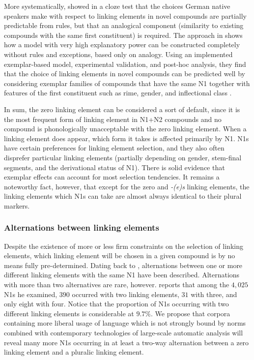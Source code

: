 More systematically, \textcite{DresslerEa2001} showed in a cloze test that the choices German native speakers make with respect to linking elements in novel compounds are partially predictable from rules, but that an analogical component (similarity to existing compounds with the same first constituent) is required.
The approach in \textcite{KrottEa2007} shows how a model with very high explanatory power can be constructed completely without rules and exceptions, based only on analogy.
Using an implemented exemplar-based model, experimental validation, and post-hoc analysis, they find that the choice of linking elements in novel compounds can be predicted well by considering exemplar families of compounds that have the same N1 together with features of the first constituent such as rime, gender, and inflectional class \parencite[47]{KrottEa2007}.

In sum, the zero linking element can be considered a sort of default, since it is the most frequent form of linking element in N1+N2 compounds and no compound is phonologically unacceptable with the zero linking element.
When a linking element does appear, which form it takes is affected primarily by N1.
N1s have certain preferences for linking element selection, and they also often disprefer particular linking elements (partially depending on gender, stem-final segments, and the derivational status of N1).
There is solid evidence that exemplar effects can account for most selection tendencies.
It remains a noteworthy fact, however, that except for the zero and \textit{-(e)s} linking elements, the linking elements which N1s can take are almost always identical to their plural markers.

\subsubsection{Alternations between linking elements}

Despite the existence of more or less firm constraints on the selection of linking elements, which linking element will be chosen in a given compound is by no means fully pre-determined.
Dating back to \textcite{Augst1975}, alternations between one or more different linking elements with the same N1 have been described.
Alternations with more than two alternatives are rare, however.
\textcite[134--135]{Augst1975} reports that among the $4,025$ N1s he examined, $390$ occurred with two linking elements, $31$ with three, and only eight with four.
Notice that the proportion of N1s occurring with two different linking elements is considerable at $9.7\%$.
We propose that corpora containing more liberal usage of language which is not strongly bound by norms combined with contemporary technologies of large-scale automatic analysis will reveal many more N1s occurring in at least a two-way alternation between a zero linking element and a pluralic linking element. %

